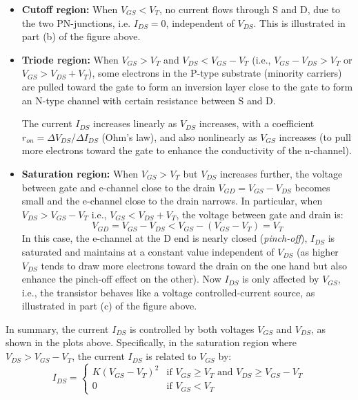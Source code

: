 \begin{itemize}
  \item {\bf Cutoff region:} When $V_{GS}<V_T$, no current flows through S and D,
    due to the two PN-junctions, i.e. $I_{DS}=0$, independent of $V_{DS}$. This
    is illustrated in part (b) of the figure above.

  \item {\bf Triode region:} When $V_{GS}>V_T$ and $V_{DS}<V_{GS}-V_T$ (i.e., 
    $V_{GS}-V_{DS}>V_T$ or $V_{GS}>V_{DS}+V_T$), some electrons in the P-type 
    substrate (minority carriers) are pulled toward the gate to form an 
    inversion layer close to the gate to form an N-type channel with certain 
    resistance between S and D. 

    The current $I_{DS}$ increases linearly as $V_{DS}$ increases, with a coefficient 
    $r_{on}=\Delta V_{DS}/\Delta I_{DS}$ (Ohm's law), and also nonlinearly as $V_{GS}$ 
    increases (to pull more electrons toward the gate to enhance the conductivity 
    of the n-channel).

  \item {\bf Saturation region:} When $V_{GS}>V_T$ but $V_{DS}$ increases further,
    the voltage between gate and e-channel close to the drain $V_{GD}=V_{GS}-V_{DS}$ 
    becomes small and the e-channel close to the drain narrows. In particular,
    when $V_{DS}>V_{GS}-V_T$ i.e., $V_{GS}<V_{DS}+V_T$, the voltage between gate and 
    drain is:
    \[ V_{GD}=V_{GS}-V_{DS}<V_{GS}-(V_{GS}-V_T)=V_T \]
    In this case, the e-channel at the D end is nearly closed ({\em pinch-off}), 
    $I_{DS}$ is saturated and maintains at a constant value independent of $V_{DS}$ 
    (as higher $V_{DS}$ tends to draw more electrons toward the drain on the one
    hand but also enhance the pinch-off effect on the other). Now $I_{DS}$ is only 
    affected by $V_{GS}$, i.e., the transistor behaves like a voltage 
    controlled-current source, as illustrated in part (c) of the figure above.
 \end{itemize}

 In summary, the current $I_{DS}$ is controlled by both voltages $V_{GS}$ and
 $V_{DS}$, as shown in the plots above. Specifically, in the saturation region
 where $V_{DS}>V_{GS}-V_T$, the current $I_{DS}$ is related to $V_{GS}$ by:
 \[ I_{DS}=\left\{ \begin{array}{ll}
   K(V_{GS}-V_T)^2 & \mbox{if $V_{GS}\ge V_T$ and $V_{DS}\ge V_{GS}-V_T$} \\
     0 & \mbox{if $V_{GS}<V_T$} \end{array} \right. \]

